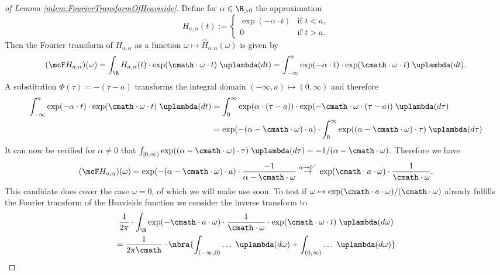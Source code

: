 \begin{proof}[of Lemma \ref{mlem:FourierTransformOfHeaviside}]
    Define for $\alpha\in\R_{>0}$ the approximation
    \[
        H_{a,\alpha}(t):=\begin{cases}
            \exp(-\alpha\cdot t) & \text{if } t < a, \\
            0 & \text{if } t > a.
        \end{cases}
    \]
    Then the Fourier transform of $H_{a,\alpha}$ as a function $\omega\mapsto\hat H_{a,\alpha}(\omega)$ is given by
    \[
        (\mcF H_{a,\alpha})(\omega) = \int_{\R}H_{a,\alpha}(t)\cdot\exp(\cmath\cdot\omega\cdot t)\;\uplambda(dt) = \int_{-\infty}^a\exp(-\alpha\cdot t)\cdot\exp(\cmath\cdot\omega\cdot t)\;\uplambda(dt).
    \]
    A substitution $\Phi(\tau) = -(\tau - a)$ transforms the integral domain $(-\infty,a)\mapsto (0,\infty)$ and therefore
    \begin{align*}
        \int_{-\infty}^a\exp(-\alpha\cdot t)\cdot\exp(\cmath\cdot\omega\cdot t)\;\uplambda(dt) &= \int_{0}^\infty\exp(\alpha\cdot(\tau - a))\cdot\exp(-\cmath\cdot\omega\cdot(\tau - a))\;\uplambda(d\tau) \\
        &= \exp(-(\alpha - \cmath\cdot\omega)\cdot a)\cdot\int_{0}^\infty\exp((\alpha - \cmath\cdot\omega)\cdot\tau)\;\uplambda(d\tau)
    \end{align*}
    It can now be verified
    for $\alpha\neq 0$ that $\int_{[0,\infty)}\exp((\alpha - \cmath\cdot\omega)\cdot\tau)\;\uplambda(d\tau) = -1/(\alpha - \cmath\cdot\omega)$. Therefore we have 
    \[
        (\mcF H_{a,\alpha})(\omega) = \exp(-(\alpha - \cmath\cdot\omega)\cdot a)\cdot\frac{-1}{\alpha - \cmath\cdot\omega} \stackrel{\alpha\to 0^+}{\to} \exp(\cmath\cdot a\cdot\omega)\cdot\frac{1}{\cmath\cdot\omega}.
    \]
    This candidate does cover the case $\omega = 0$, of which we will make use soon. To test if $\omega\mapsto \exp(\cmath\cdot a\cdot\omega)/(\cmath\cdot\omega)$ already fulfills the Fourier transform of the Heaviside function we consider the inverse transform to
    \begin{multline}
        \frac{1}{2\pi}\cdot\int_{\R}\exp(-\cmath\cdot a\cdot\omega)\cdot\frac{1}{\cmath\cdot\omega}\cdot\exp(\cmath\cdot\omega\cdot t)\;\uplambda(d\omega) \\
        = \frac{1}{2\pi\cmath}\cdot\nbra{
            \int_{(-\infty,0)}\ldots\;\uplambda(d\omega) + \int_{(0,\infty)}\ldots\;\uplambda(d\omega)
}
\end{multline}
\end{proof}
